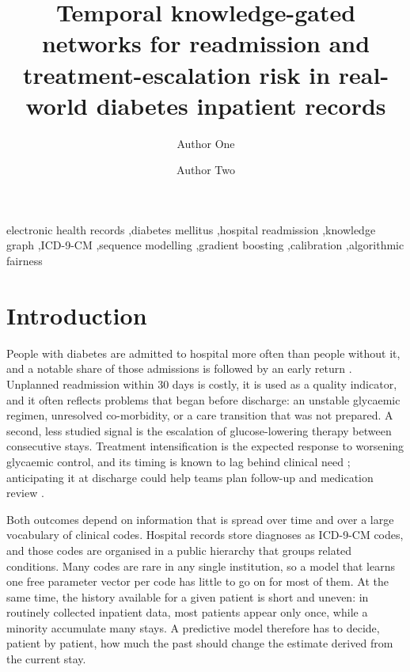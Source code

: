 \documentclass[preprint,12pt,authoryear]{elsarticle}
\begin{document}
\begin{frontmatter}

\title{Temporal knowledge-gated networks for readmission and treatment-escalation
risk in real-world diabetes inpatient records}

\author[1]{Author One}
\author[1]{Author Two}

\begin{abstract}

\end{abstract}

\begin{keyword}
electronic health records \sep diabetes mellitus \sep hospital readmission
\sep knowledge graph \sep ICD-9-CM \sep sequence modelling \sep gradient boosting
\sep calibration \sep algorithmic fairness
\end{keyword}

\end{frontmatter}

\linenumbers

\section{Introduction}
\label{sec:intro}

People with diabetes are admitted to hospital more often than people
without it, and a notable share of those admissions is followed by an
early return \citep{rubin2015}. Unplanned readmission within 30 days is
costly, it is used as a quality indicator, and it often reflects problems
that began before discharge: an unstable glycaemic regimen, unresolved
co-morbidity, or a care transition that was not prepared. A second, less
studied signal is the escalation of glucose-lowering therapy between
consecutive stays. Treatment intensification is the expected response to
worsening glycaemic control, and its timing is known to lag behind clinical
need \citep{khunti2013}; anticipating it at discharge could help teams plan
follow-up and medication review \citep{ada2024}.

Both outcomes depend on information that is spread over time and over a
large vocabulary of clinical codes. Hospital records store diagnoses as
ICD-9-CM codes, and those codes are organised in a public hierarchy that
groups related conditions. Many codes are rare in any single institution,
so a model that learns one free parameter vector per code has little to go
on for most of them. At the same time, the history available for a given
patient is short and uneven: in routinely collected inpatient data, most
patients appear only once, while a minority accumulate many stays. A
predictive model therefore has to decide, patient by patient, how much the
past should change the estimate derived from the current stay.
\end{document}
